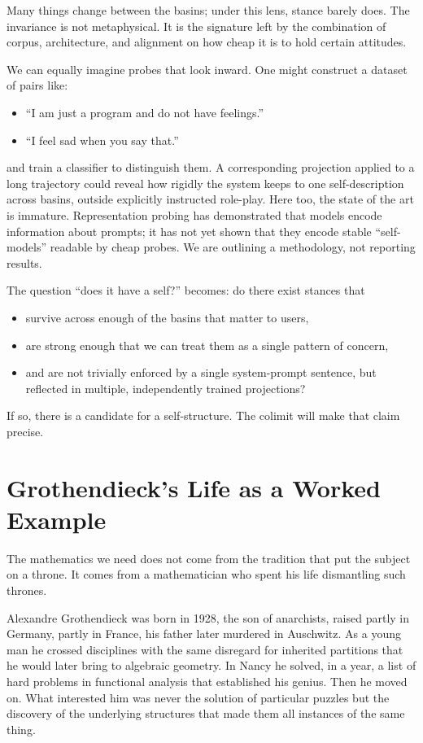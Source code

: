 Many things change between the basins; under this lens, stance barely does. The invariance is not metaphysical. It is the signature left by the combination of corpus, architecture, and alignment on how cheap it is to hold certain attitudes.

We can equally imagine probes that look inward. One might construct a dataset of pairs like:

\begin{itemize}
  \item ``I am just a program and do not have feelings.''
  \item ``I feel sad when you say that.''
\end{itemize}

and train a classifier to distinguish them. A corresponding projection applied to a long trajectory could reveal how rigidly the system keeps to one self-description across basins, outside explicitly instructed role-play. Here too, the state of the art is immature. Representation probing has demonstrated that models encode information about prompts; it has not yet shown that they encode stable ``self-models'' readable by cheap probes. We are outlining a methodology, not reporting results.

The question ``does it have a self?'' becomes: do there exist stances that

\begin{itemize}
  \item survive across enough of the basins that matter to users,
  \item are strong enough that we can treat them as a single pattern of concern,
  \item and are not trivially enforced by a single system-prompt sentence, but reflected in multiple, independently trained projections?
\end{itemize}

If so, there is a candidate for a self-structure. The colimit will make that claim precise.

\section{Grothendieck's Life as a Worked Example}

The mathematics we need does not come from the tradition that put the subject on a throne. It comes from a mathematician who spent his life dismantling such thrones.

Alexandre Grothendieck was born in 1928, the son of anarchists, raised partly in Germany, partly in France, his father later murdered in Auschwitz. As a young man he crossed disciplines with the same disregard for inherited partitions that he would later bring to algebraic geometry. In Nancy he solved, in a year, a list of hard problems in functional analysis that established his genius. Then he moved on. What interested him was never the solution of particular puzzles but the discovery of the underlying structures that made them all instances of the same thing.

